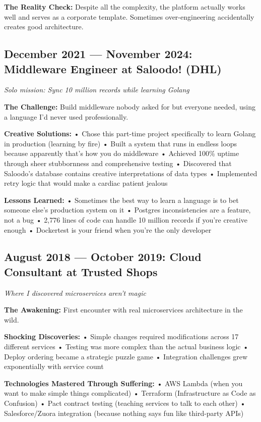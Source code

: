 \documentclass[10pt,a4paper]{article}
\begin{document}
\textbf{The Reality Check:} Despite all the complexity, the platform actually works well and serves as a corporate template. Sometimes over-engineering accidentally creates good architecture.

\subsection{December 2021 — November 2024: Middleware Engineer at Saloodo! (DHL)}
\textit{Solo mission: Sync 10 million records while learning Golang}

\textbf{The Challenge:} Build middleware nobody asked for but everyone needed, using a language I'd never used professionally.

\textbf{Creative Solutions:}
• Chose this part-time project specifically to learn Golang in production (learning by fire)
• Built a system that runs in endless loops because apparently that's how you do middleware
• Achieved 100\% uptime through sheer stubbornness and comprehensive testing
• Discovered that Saloodo's database contains creative interpretations of data types
• Implemented retry logic that would make a cardiac patient jealous

\textbf{Lessons Learned:}
• Sometimes the best way to learn a language is to bet someone else's production system on it
• Postgres inconsistencies are a feature, not a bug
• 2,776 lines of code can handle 10 million records if you're creative enough
• Dockertest is your friend when you're the only developer

\subsection{August 2018 — October 2019: Cloud Consultant at Trusted Shops}
\textit{Where I discovered microservices aren't magic}

\textbf{The Awakening:} First encounter with real microservices architecture in the wild.

\textbf{Shocking Discoveries:}
• Simple changes required modifications across 17 different services
• Testing was more complex than the actual business logic
• Deploy ordering became a strategic puzzle game
• Integration challenges grew exponentially with service count

\textbf{Technologies Mastered Through Suffering:}
• AWS Lambda (when you want to make simple things complicated)
• Terraform (Infrastructure as Code as Confusion)
• Pact contract testing (teaching services to talk to each other)
• Salesforce/Zuora integration (because nothing says fun like third-party APIs)
\end{document}
